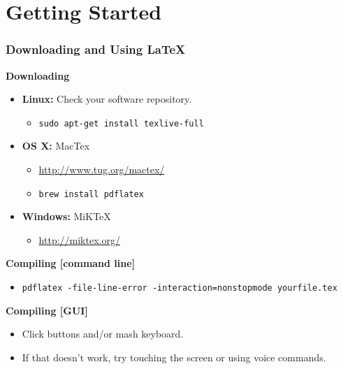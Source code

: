 \documentclass[notes=only]{beamer}
\begin{document}
\section{Getting Started}
\begin{frame} \frametitle{Downloading and Using \LaTeX}
    \textbf{Downloading}
    \begin{itemize}
        \item \textbf{Linux:} Check your software repository.
        \begin{itemize} \item \texttt{sudo apt-get install texlive-full} \end{itemize}  
        \item \textbf{OS X:} MacTex
        \begin{itemize} \item \url{http://www.tug.org/mactex/}
        \item \texttt{brew install pdflatex} \end{itemize}
        \item \textbf{Windows:} MiKTeX 
        \begin{itemize} \item \url{http://miktex.org/} \end{itemize}
    \end{itemize}
        
    \textbf{Compiling [command line]}
    \begin{itemize}
        \item {\scriptsize \texttt{pdflatex -file-line-error -interaction=nonstopmode yourfile.tex}}
    \end{itemize}

    \textbf{Compiling [GUI]}
    \begin{itemize}
            \item Click buttons and/or mash keyboard.  
            \item If that doesn't work, try touching the screen or using voice commands.
    \end{itemize}
\end{frame}
\end{document}
